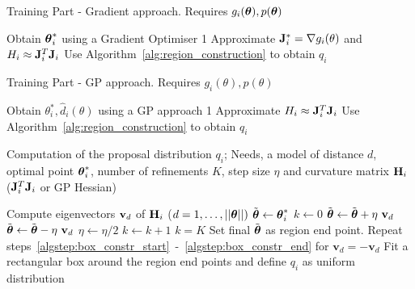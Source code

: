 \begin{minipage}{0.46\textwidth}
\begin{algorithm}[H]
    \centering
    \caption{Training Part - Gradient approach. Requires $g_i(\boldsymbol{\theta}), p(\boldsymbol{\theta})$}\label{alg:training_GB}
    \begin{algorithmic}[1]
        \State Obtain $\boldsymbol{\theta}_i^*$ using a Gradient Optimiser
         1
        \Else
        \State Approximate $\mathbf{J}_i^* = \nabla g_i(\theta)$ and $H_i \approx \mathbf{J}^T_i\mathbf{J}_i$
        \State Use Algorithm~\ref{alg:region_construction} to obtain $q_i$
        \EndIf      
      \EndFor
    \end{algorithmic}
\end{algorithm}
\end{minipage}
\hfill
\begin{minipage}{0.46\textwidth}
\begin{algorithm}[H]
    \centering
    \caption{Training Part - GP approach. Requires $g_i(\theta), p(\theta)$}\label{alg:training_GP}
    \begin{algorithmic}[1]
        \State Obtain $\theta_i^*, \hat{d}_i(\theta)$ using a GP approach
         1
        \Else
        \State Approximate $H_i \approx \mathbf{J}^T_i \mathbf{J}_i$
        \State Use Algorithm~\ref{alg:region_construction} to obtain $q_i$
        \EndIf      
      \EndFor
    \end{algorithmic}
\end{algorithm}
\end{minipage}

\begin{algorithm}[!ht]
	\caption{Computation of the proposal distribution $q_i$; Needs, a model of distance $d$, optimal point $\boldsymbol{\theta}_i^*$, number of refinements $K$, step size $\eta$ and curvature matrix $\mathbf{H}_i$ ($\mathbf{J}_i^T\mathbf{J}_i $ or GP Hessian)}\label{alg:region_construction}
	\begin{algorithmic}[1]
	\State Compute eigenvectors $\mathbf{v}_{d}$ of $\mathbf{H}_i$ {\scriptsize ($d = 1,\ldots,||\boldsymbol{\theta} ||)$}
		\State $\Tilde{\boldsymbol{\theta}} \gets \boldsymbol{\theta}_i^*$ \label{algstep:box_constr_start}
		\State $k \gets 0$
		\Repeat
        	\Repeat
                \State $\Tilde{\boldsymbol{\theta}} \gets \Tilde{\boldsymbol{\theta}} + \eta \ \mathbf{v}_{d}$ 
        	\State $\Tilde{\boldsymbol{\theta}} \gets \Tilde{\boldsymbol{\theta}} - \eta \ \mathbf{v}_{d}$
        	\State $\eta \gets \eta/2$ 
        	\State $k \gets k + 1$
    	\Until $k = K$
    	\State Set final $\Tilde{\boldsymbol{\theta}}$ as region end point. \label{algstep:box_constr_end}
    	\State Repeat steps~\ref{algstep:box_constr_start}~-~\ref{algstep:box_constr_end} for $\mathbf{v}_{d} = - \mathbf{v}_{d}$
	\EndFor
	\State Fit a rectangular box around the region end points and define $q_i$ as uniform distribution
	\end{algorithmic}
\end{algorithm}

